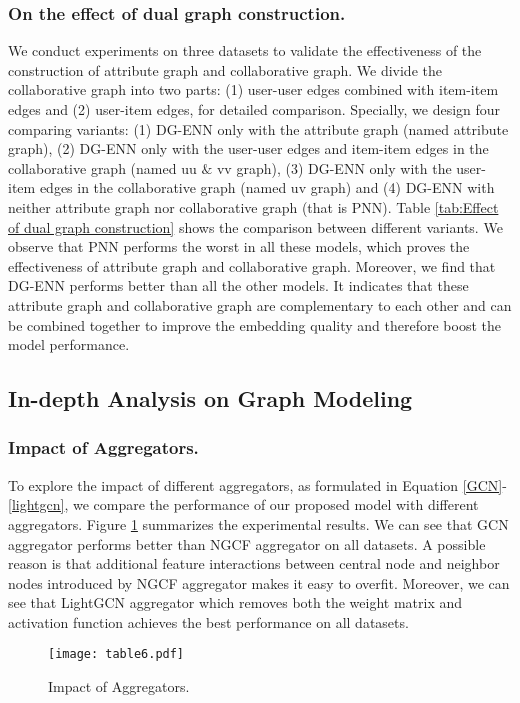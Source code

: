 \subsubsection{On the effect of dual graph construction.}
We conduct experiments on three datasets to validate the effectiveness of the construction of attribute graph and collaborative graph.
We divide the collaborative graph into two parts: (1) user-user edges combined with item-item edges and (2) user-item edges, for detailed comparison.
Specially, we design four comparing variants: (1) DG-ENN only with the attribute graph (named attribute graph), (2) DG-ENN only with the user-user edges and item-item edges in the collaborative graph (named uu $\&$ vv graph), (3) DG-ENN only with the user-item edges in the collaborative graph (named uv graph) and (4) DG-ENN with neither attribute graph nor collaborative graph (that is PNN).
Table 
\ref{tab:Effect of dual graph construction} shows the comparison between different variants. 
We observe that PNN performs the worst in all these models, which proves the effectiveness of attribute graph and collaborative graph.
Moreover, we find that DG-ENN performs better than all the other models. 
It indicates that these attribute graph and collaborative graph are complementary to each other and can be combined together to improve the embedding quality and therefore boost the model performance.

\subsection{In-depth Analysis on Graph Modeling}\label{componentComparison}

\subsubsection{Impact of Aggregators.}
To explore the impact of different aggregators, as formulated in Equation \ref{GCN}-\ref{lightgcn}, we compare the performance of our proposed model with different aggregators.
Figure \ref{fig:figureaggregators} summarizes the experimental results.
We can see that GCN aggregator performs better than NGCF aggregator on all datasets.
A possible reason is that additional feature interactions between central node and neighbor nodes introduced by NGCF aggregator makes it easy to overfit.
Moreover, we can see that LightGCN aggregator which removes both the weight matrix and activation function achieves the best performance on all datasets.
\begin{figure}[htp]
	\centering
	\setlength{\belowcaptionskip}{-0.3cm}
	\setlength{\abovecaptionskip}{0cm}
	\texttt{[image: table6.pdf]}
	\caption{Impact of Aggregators.}
	\label{fig:figureaggregators}
\end{figure}

